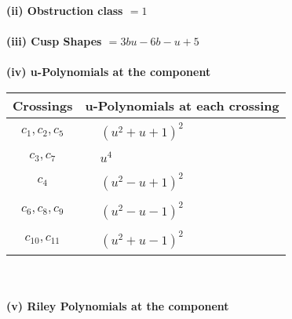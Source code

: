 \documentclass[1p]{elsarticle_modified}
\theoremstyle{definition}
\begin{document}
\flushleft \textbf{(ii) Obstruction class $= 1$}\\~\\
\flushleft \textbf{(iii) Cusp Shapes $= 3 b u-6 b- u+5$}\\~\\
\newpage\renewcommand{\arraystretch}{1}
\flushleft \textbf{(iv) u-Polynomials at the component}\newline \\
\begin{tabular}{m{50pt}|m{274pt}}
Crossings & \hspace{64pt}u-Polynomials at each crossing \\
\hline $$\begin{aligned}c_{1},c_{2},c_{5}\end{aligned}$$&$\begin{aligned}
&(u^2+u+1)^2
\end{aligned}$\\
\hline $$\begin{aligned}c_{3},c_{7}\end{aligned}$$&$\begin{aligned}
&u^4
\end{aligned}$\\
\hline $$\begin{aligned}c_{4}\end{aligned}$$&$\begin{aligned}
&(u^2- u+1)^2
\end{aligned}$\\
\hline $$\begin{aligned}c_{6},c_{8},c_{9}\end{aligned}$$&$\begin{aligned}
&(u^2- u-1)^2
\end{aligned}$\\
\hline $$\begin{aligned}c_{10},c_{11}\end{aligned}$$&$\begin{aligned}
&(u^2+u-1)^2
\end{aligned}$\\
\hline
\end{tabular}\\~\\
\newpage\renewcommand{\arraystretch}{1}
\flushleft \textbf{(v) Riley Polynomials at the component}\newline \\
\end{document}
